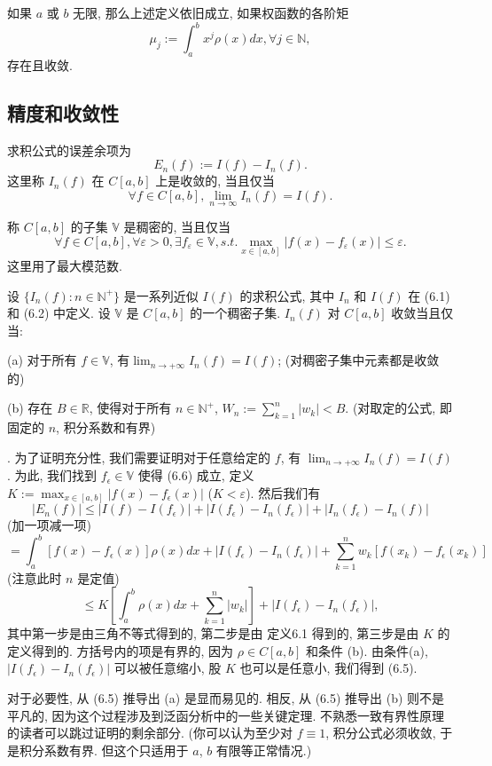 \documentclass[a4paper]{ctexart}
\newcommand{\hl}[1]
{\noindent {\bf {#1}}}
\begin{document}
{\hl{例 6.2} 如果 $a$ 或 $b$ 无限, 那么上述定义依旧成立, 如果权函数的各阶矩
$$
\mu_j := \int_a^b x^j \rho(x) dx, \forall j \in \mathbb{N}, 
$$
存在且收敛. 

\subsection{精度和收敛性}
\hl{定义 6.3} 求积公式的误差余项为
$$
E_n(f) := I(f) - I_n(f).
$$
这里称 $I_n(f)$ 在 $C[a, b]$ 上是收敛的, 当且仅当
$$
\forall f \in C[a, b], \lim_{n \to \infty} I_n(f) = I(f).
$$

\hl{定义 6.4} 称 $C[a, b]$ 的子集 $\mathbb{V}$ 是稠密的, 当且仅当
$$
\forall f \in C[a, b], \forall \varepsilon > 0, 
\exists f_\varepsilon \in \mathbb{V}, s. t. 
\max_{x \in [a, b]}\left|f(x) - f_\varepsilon(x)\right| \leq \varepsilon. 
$$
这里用了最大模范数. 

\hl{定理6.5} 设 $\{I_n(f) : n \in \mathbb{N}^+\}$ 是一系列近似 $I(f)$ 的求积公式, 
其中 $I_n$ 和 $I(f)$ 在 (6.1) 和 (6.2) 中定义. 设 $\mathbb{V}$ 是 $C[a, b]$ 的一个稠密子集. 
$I_n(f)$ 对 $C[a, b]$ 收敛当且仅当: 

(a) 对于所有 $f \in \mathbb{V}$, 有$\lim_{n \to +\infty} I_n(f) = I(f)$; 
(对稠密子集中元素都是收敛的)

(b) 存在 $B \in \mathbb{R}$, 使得对于所有 $n \in \mathbb{N}^+$, $W_n := \sum_{k = 1}^{n} |w_k| < B$. 
(对取定的公式, 即固定的 $n$, 积分系数和有界)

\hl{证明}. 为了证明充分性, 我们需要证明对于任意给定的 $f$, 有 $\lim_{n \to +\infty} I_n(f) = I(f)$. 
为此, 我们找到 $f_{\epsilon} \in \mathbb{V}$ 使得 (6.6) 成立, 定义 
$K := \max_{x \in [a,b]} |f(x) - f_{\epsilon}(x)|$ ($K < \varepsilon$). 然后我们有
\[
|E_n(f)| \leq |I(f) - I(f_{\epsilon})| 
+ |I(f_{\epsilon}) - I_n(f_{\epsilon})| + |I_n(f_{\epsilon}) - I_n(f)|
\]
(加一项减一项)
\[
= \int_{a}^{b} [f(x) - f_{\epsilon}(x)] \rho(x)dx + 
|I(f_{\epsilon}) - I_n(f_{\epsilon})| + \sum_{k = 1}^{n} w_k [f(x_k) - f_{\epsilon}(x_k)]
\]
(注意此时 $n$ 是定值)
\[
\leq K \left[\int_{a}^{b} \rho(x)dx + \sum_{k=1}^{n} |w_k|\right] + |I(f_{\epsilon}) - I_n(f_{\epsilon})|,
\]
其中第一步是由三角不等式得到的, 第二步是由 定义6.1 得到的, 第三步是由 $K$ 的定义得到的. 
方括号内的项是有界的, 因为 $\rho \in C[a, b]$ 和条件 (b). 由条件(a), 
$|I(f_{\epsilon}) - I_n(f_{\epsilon})|$ 可以被任意缩小, 股 $K$ 也可以是任意小, 我们得到 (6.5).

对于必要性, 从 (6.5) 推导出 (a) 是显而易见的. 相反, 从 (6.5) 推导出 (b) 则不是平凡的, 
因为这个过程涉及到泛函分析中的一些关键定理. 不熟悉一致有界性原理的读者可以跳过证明的剩余部分. 
(你可以认为至少对 $f \equiv 1$, 积分公式必须收敛, 于是积分系数有界. 但这个只适用于 $a$, $b$ 有限等正常情况.)

}
\end{document}
